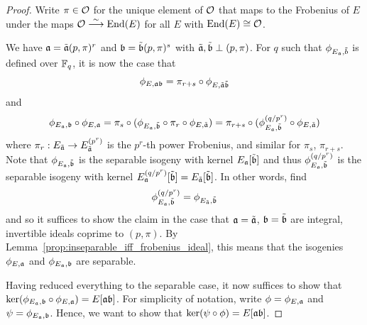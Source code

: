\begin{proof}
    Write $\pi \in \mathcal{O}$ for the unique element of $\mathcal{O}$ that maps to the Frobenius of $E$ under the maps $\mathcal{O} \overset{\sim}{\longrightarrow} \mathrm{End}(E)$ for all $E$ with $\mathrm{End}(E) \cong \mathcal{O}$.
    
    We have $\mathfrak{a} = \tilde{\mathfrak{a}} (p, \pi)^r$ and $\mathfrak{b} = \tilde{\mathfrak{b}} (p, \pi)^s$ with $\tilde{\mathfrak{a}}, \tilde{\mathfrak{b}} \perp (p, \pi)$.
    For $q$ such that $\phi_{E_{\mathfrak{a}}, \tilde{b}}$ is defined over $\mathbb{F}_q$, it is now the case that
    \begin{equation*}
        \phi_{E, \mathfrak{a}\mathfrak{b}} = \pi_{r + s} \circ \phi_{E, \tilde{\mathfrak{a}} \tilde{\mathfrak{b}}}
    \end{equation*}
    and
    \begin{equation*}
        \phi_{E_{\mathfrak{a}}, \mathfrak{b}} \circ \phi_{E, \mathfrak{a}} = \pi_s \circ (\phi_{E_{\mathfrak{a}}, \tilde{\mathfrak{b}}} \circ \pi_r \circ \phi_{E, \tilde{\mathfrak{a}}}) = \pi_{r + s} \circ (\phi_{E_{\mathfrak{a}}, \tilde{\mathfrak{b}}}^{(q/p^r)} \circ \phi_{E, \tilde{\mathfrak{a}}})
    \end{equation*}
    where $\pi_r: E_{\tilde{\mathfrak{a}}} \to E_{\tilde{\mathfrak{a}}}^{(p^r)}$ is the $p^r$-th power Frobenius, and similar for $\pi_s$, $\pi_{r + s}$. 
    Note that $\phi_{E_{\mathfrak{a}}, \tilde{\mathfrak{b}}}$ is the separable isogeny with kernel $E_{\mathfrak{a}}[\tilde{\mathfrak{b}}]$ and thus $\phi_{E_{\mathfrak{a}}, \tilde{\mathfrak{b}}}^{(q/p^r)}$ is the separable isogeny with kernel $E_{\mathfrak{a}}^{(q/p^r)}[\tilde{\mathfrak{b}}] = E_{\tilde{\mathfrak{a}}}[\tilde{\mathfrak{b}}]$.
    In other words, find
    \begin{equation*}
        \phi_{E_{\mathfrak{a}}, \tilde{\mathfrak{b}}}^{(q/p^r)} = \phi_{E_{\tilde{\mathfrak{a}}}, \tilde{\mathfrak{b}}}
    \end{equation*}
    and so it suffices to show the claim in the case that $\mathfrak{a} = \tilde{\mathfrak{a}}$, $\mathfrak{b} = \tilde{\mathfrak{b}}$ are integral, invertible ideals coprime to $(p, \pi)$.
    By Lemma~\ref{prop:inseparable_iff_frobenius_ideal}, this means that the isogenies $\phi_{E, \mathfrak{a}}$ and $\phi_{E_{\mathfrak{a}}, \mathfrak{b}}$ are separable.

    Having reduced everything to the separable case, it now suffices to show that $\ker(\phi_{E_{\mathfrak{a}}, \mathfrak{b}} \circ \phi_{E, \mathfrak{a}}) = E[\mathfrak{a}\mathfrak{b}]$.
    For simplicity of notation, write $\phi = \phi_{E, \mathfrak{a}}$ and $\psi = \phi_{E_{\mathfrak{a}}, \mathfrak{b}}$.
    Hence, we want to show that $\ker(\psi \circ \phi) = E[\mathfrak{a}\mathfrak{b}]$.


\end{proof}
